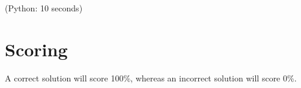 \documentclass{saco}
\begin{document}

\timelimit (Python: 10 seconds)

\feedback

\section{Scoring}

A correct solution will score 100\%, whereas an incorrect solution will score 0\%.
\end{document}
